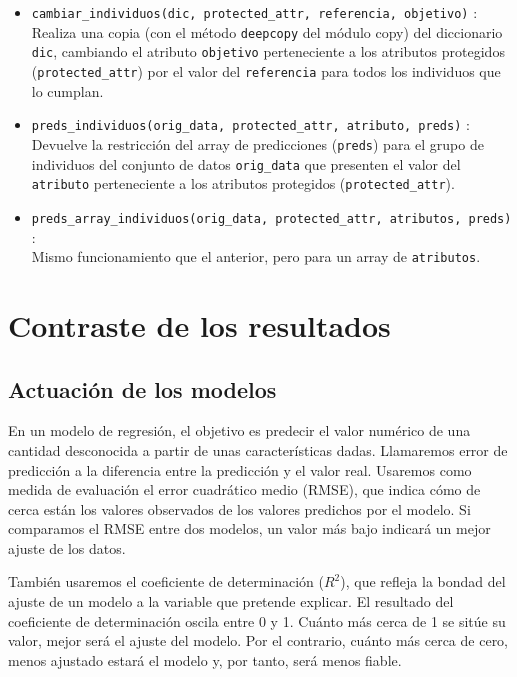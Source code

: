 \documentclass[oneside,openright,titlepage,numbers=noenddot,openany,headinclude,footinclude=true,
cleardoublepage=empty,abstractoff,BCOR=5mm,paper=a4,fontsize=12pt,main=spanish]{scrreprt}
\begin{document}
\begin{itemize}
    \item \texttt{cambiar\_individuos(dic, protected\_attr, referencia, objetivo)} :\\
    Realiza una copia (con el método \texttt{deepcopy} del módulo copy) del diccionario \texttt{dic}, cambiando el atributo \texttt{objetivo} perteneciente a los atributos protegidos (\texttt{protected\_attr}) por el valor del \texttt{referencia} para todos los individuos que lo cumplan.\\
    \item \texttt{preds\_individuos(orig\_data, protected\_attr, atributo, preds)} :\\
    Devuelve la restricción del array de predicciones (\texttt{preds}) para el grupo de individuos del conjunto de datos \texttt{orig\_data} que presenten el valor del \texttt{atributo} perteneciente a los atributos protegidos (\texttt{protected\_attr}).\\
    \item \texttt{preds\_array\_individuos(orig\_data, protected\_attr, atributos, preds)} :\\
    Mismo funcionamiento que el anterior, pero para un array de \texttt{atributos}.
\end{itemize}

\section{Contraste de los resultados} \label{sec:contrastresults}

\subsection{Actuación de los modelos}

En un modelo de regresión, el objetivo es predecir el valor numérico de una cantidad desconocida a partir de unas características dadas. Llamaremos error de predicción a la diferencia entre la predicción y el valor real. Usaremos como medida de evaluación el error cuadrático medio (RMSE), que indica cómo de cerca están los valores observados de los valores predichos por el modelo. Si comparamos el RMSE entre dos modelos, un valor más bajo indicará un mejor ajuste de los datos.

También usaremos el coeficiente de determinación ($R^2$), que refleja la bondad del ajuste de un modelo a la variable que pretende explicar. El resultado del coeficiente de determinación oscila entre 0 y 1. Cuánto más cerca de 1 se sitúe su valor, mejor será el ajuste del modelo. Por el contrario, cuánto más cerca de cero, menos ajustado estará el modelo y, por tanto, será menos fiable.\\
\end{document}
